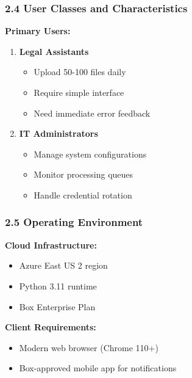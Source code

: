 \documentclass[
]{article}
\providecommand{\tightlist}{%
  \setlength{\itemsep}{0pt}\setlength{\parskip}{0pt}}
\begin{document}
\hypertarget{user-classes-and-characteristics}{%
\subsubsection{\texorpdfstring{\textbf{2.4 User Classes and
Characteristics}}{2.4 User Classes and Characteristics}}\label{user-classes-and-characteristics}}

\textbf{Primary Users:}

\begin{enumerate}
\def\labelenumi{\arabic{enumi}.}
\item
  \textbf{Legal Assistants}

  \begin{itemize}
  \tightlist
  \item
    Upload 50-100 files daily
  \item
    Require simple interface
  \item
    Need immediate error feedback
  \end{itemize}
\item
  \textbf{IT Administrators}

  \begin{itemize}
  \tightlist
  \item
    Manage system configurations
  \item
    Monitor processing queues
  \item
    Handle credential rotation
  \end{itemize}
\end{enumerate}

\hypertarget{operating-environment}{%
\subsubsection{\texorpdfstring{\textbf{2.5 Operating
Environment}}{2.5 Operating Environment}}\label{operating-environment}}

\textbf{Cloud Infrastructure:}

\begin{itemize}
\tightlist
\item
  Azure East US 2 region
\item
  Python 3.11 runtime
\item
  Box Enterprise Plan
\end{itemize}

\textbf{Client Requirements:}

\begin{itemize}
\tightlist
\item
  Modern web browser (Chrome 110+)
\item
  Box-approved mobile app for notifications
\end{itemize}
\end{document}
